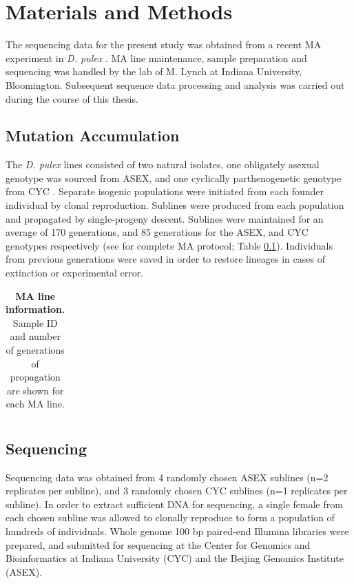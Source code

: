 \documentclass[12pt,twoside]{reedthesis}
\begin{document}
\chapter*{Materials and Methods}
The sequencing data for the present study was obtained from a recent \gls{MA} experiment in \textit{D. pulex} \citep{keith_high_2015}.
\gls{MA} line maintenance, sample preparation and sequencing was handled by the lab of M. Lynch at Indiana University, Bloomington.
Subsequent sequence data processing and analysis was carried out during the course of this thesis.

\section{Mutation Accumulation}
The \textit{D. pulex} lines consisted of two natural isolates, one obligately asexual genotype was sourced from \gls{ASEX}, and one cyclically parthenogenetic genotype from \gls{CYC} .
Separate isogenic populations were initiated from each founder individual by clonal reproduction. 
Sublines were produced from each population and propagated by single-progeny descent.
Sublines were maintained for an average of 170 generations, and 85 generations for the \gls{ASEX}, and \gls{CYC} genotypes respectively (see \citealp{keith_high_2015} for complete \gls{MA} protocol; Table \ref{isolateInfo}).
Individuals from previous generations were saved in order to restore lineages in cases of extinction or experimental error. 

\begin{table}[h]
    \begin{center}
        \begin{tabular}{lrc}\hline
        \end{tabular}
        \caption[MA line information]{\textbf{MA line information.} Sample ID and number of generations of propagation are shown for each MA line.}
        \label{isolateInfo}
    \end{center}
\end{table}

\section{Sequencing}
Sequencing data was obtained from 4 randomly chosen \gls{ASEX} sublines (n=2 replicates per subline), and 3 randomly chosen \gls{CYC} sublines (n=1 replicates per subline).
In order to extract sufficient DNA for sequencing, a single female from each chosen subline was allowed to clonally reproduce to form a population of hundreds of individuals.
Whole genome 100 bp paired-end Illumina libraries were prepared, and submitted for sequencing at the Center for Genomics and Bioinformatics at Indiana University (CYC) and the Beijing Genomics Institute (ASEX).
\end{document}
